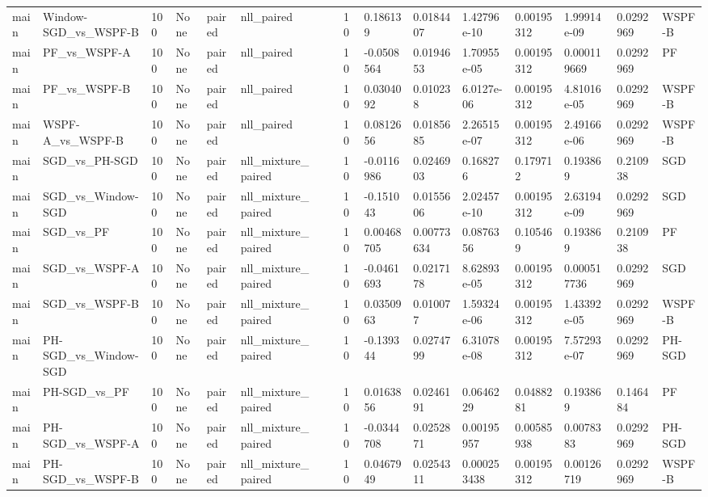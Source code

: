 \begin{tabular}{llllllllllllllll}
main & Window-SGD\_vs\_WSPF-B & 100 & None & paired & nll\_paired &  &  & 10 & 0.186139 & 0.0184407 & 1.42796e-10 & 0.00195312 & 1.99914e-09 & 0.0292969 & WSPF-B \\
main & PF\_vs\_WSPF-A & 100 & None & paired & nll\_paired &  &  & 10 & -0.0508564 & 0.0194653 & 1.70955e-05 & 0.00195312 & 0.000119669 & 0.0292969 & PF \\
main & PF\_vs\_WSPF-B & 100 & None & paired & nll\_paired &  &  & 10 & 0.0304092 & 0.010238 & 6.0127e-06 & 0.00195312 & 4.81016e-05 & 0.0292969 & WSPF-B \\
main & WSPF-A\_vs\_WSPF-B & 100 & None & paired & nll\_paired &  &  & 10 & 0.0812656 & 0.0185685 & 2.26515e-07 & 0.00195312 & 2.49166e-06 & 0.0292969 & WSPF-B \\
main & SGD\_vs\_PH-SGD & 100 & None & paired & nll\_mixture\_paired &  &  & 10 & -0.0116986 & 0.0246903 & 0.168276 & 0.179712 & 0.193869 & 0.210938 & SGD \\
main & SGD\_vs\_Window-SGD & 100 & None & paired & nll\_mixture\_paired &  &  & 10 & -0.151043 & 0.0155606 & 2.02457e-10 & 0.00195312 & 2.63194e-09 & 0.0292969 & SGD \\
main & SGD\_vs\_PF & 100 & None & paired & nll\_mixture\_paired &  &  & 10 & 0.00468705 & 0.00773634 & 0.0876356 & 0.105469 & 0.193869 & 0.210938 & PF \\
main & SGD\_vs\_WSPF-A & 100 & None & paired & nll\_mixture\_paired &  &  & 10 & -0.0461693 & 0.0217178 & 8.62893e-05 & 0.00195312 & 0.000517736 & 0.0292969 & SGD \\
main & SGD\_vs\_WSPF-B & 100 & None & paired & nll\_mixture\_paired &  &  & 10 & 0.0350963 & 0.010077 & 1.59324e-06 & 0.00195312 & 1.43392e-05 & 0.0292969 & WSPF-B \\
main & PH-SGD\_vs\_Window-SGD & 100 & None & paired & nll\_mixture\_paired &  &  & 10 & -0.139344 & 0.0274799 & 6.31078e-08 & 0.00195312 & 7.57293e-07 & 0.0292969 & PH-SGD \\
main & PH-SGD\_vs\_PF & 100 & None & paired & nll\_mixture\_paired &  &  & 10 & 0.0163856 & 0.0246191 & 0.0646229 & 0.0488281 & 0.193869 & 0.146484 & PF \\
main & PH-SGD\_vs\_WSPF-A & 100 & None & paired & nll\_mixture\_paired &  &  & 10 & -0.0344708 & 0.0252871 & 0.00195957 & 0.00585938 & 0.0078383 & 0.0292969 & PH-SGD \\
main & PH-SGD\_vs\_WSPF-B & 100 & None & paired & nll\_mixture\_paired &  &  & 10 & 0.0467949 & 0.0254311 & 0.000253438 & 0.00195312 & 0.00126719 & 0.0292969 & WSPF-B \\

\end{tabular}
